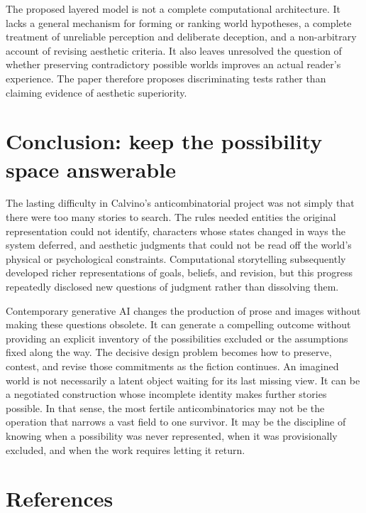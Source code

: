 \documentclass[
  11pt,
  letterpaper,
]{article}
\begin{document}
The proposed layered model is not a complete computational architecture.
It lacks a general mechanism for forming or ranking world hypotheses, a
complete treatment of unreliable perception and deliberate deception,
and a non-arbitrary account of revising aesthetic criteria. It also
leaves unresolved the question of whether preserving contradictory
possible worlds improves an actual reader's experience. The paper
therefore proposes discriminating tests rather than claiming evidence of
aesthetic superiority.

\section{Conclusion: keep the possibility space
answerable}\label{conclusion-keep-the-possibility-space-answerable}

The lasting difficulty in Calvino's anticombinatorial project was not
simply that there were too many stories to search. The rules needed
entities the original representation could not identify, characters
whose states changed in ways the system deferred, and aesthetic
judgments that could not be read off the world's physical or
psychological constraints. Computational storytelling subsequently
developed richer representations of goals, beliefs, and revision, but
this progress repeatedly disclosed new questions of judgment rather than
dissolving them.

Contemporary generative AI changes the production of prose and images
without making these questions obsolete. It can generate a compelling
outcome without providing an explicit inventory of the possibilities
excluded or the assumptions fixed along the way. The decisive design
problem becomes how to preserve, contest, and revise those commitments
as the fiction continues. An imagined world is not necessarily a latent
object waiting for its last missing view. It can be a negotiated
construction whose incomplete identity makes further stories possible.
In that sense, the most fertile anticombinatorics may not be the
operation that narrows a vast field to one survivor. It may be the
discipline of knowing when a possibility was never represented, when it
was provisionally excluded, and when the work requires letting it
return.

\section{References}\label{references}
\end{document}
